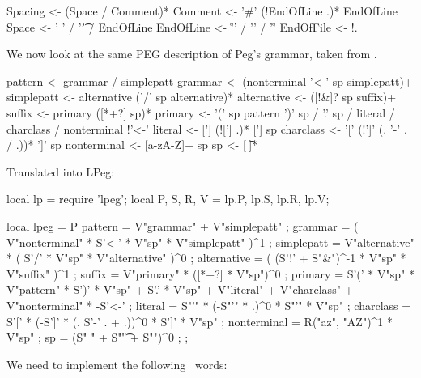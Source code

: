 Spacing    <- (Space / Comment)*
Comment    <- ’#’ (!EndOfLine .)* EndOfLine
Space      <- ’ ’ / ’\t’ / EndOfLine
EndOfLine  <- ’\r\n’ / ’\n’ / ’\r’
EndOfFile  <- !.
\stoptyping

We now look at the same PEG description of Peg's grammar, taken from 
\cite{ierusalimschy2008lpegArticle}. 

\starttyping
pattern     <- grammar / simplepatt
grammar     <- (nonterminal ’<-’ sp simplepatt)+
simplepatt  <- alternative (’/’ sp alternative)*
alternative <- ([!&]? sp suffix)+
suffix      <- primary ([*+?] sp)*
primary     <- 
  ’(’ sp pattern ’)’ sp / ’.’ sp / literal /
  charclass / nonterminal !’<-’
literal     <- [’] (![’] .)* [’] sp
charclass   <- ’[’ (!’]’ (. ’-’ . / .))* ’]’ sp
nonterminal <- [a-zA-Z]+ sp
sp          <- [ \t\n]*
\stoptyping

Translated into LPeg:

\starttyping
local lp = require 'lpeg';
local P, S, R, V = lp.P, lp.S, lp.R, lp.V;

local lpeg = P {
  pattern     = V"grammar" + V"simplepatt" ;
  grammar     = ( V"nonterminal" * S’<-’ * V"sp" * V"simplepatt" )^1 ;
  simplepatt  = V"alternative" * ( S’/’ * V"sp" * V"alternative" )^0 ;
  alternative = ( (S'!' + S"&")^-1 * V"sp" * V"suffix" )^1 ;
  suffix      = V"primary" * ([*+?] * V"sp")^0 ;
  primary     = 
    S’(’ * V"sp" * V"pattern" * S’)’ * V"sp" +
    S’.’ * V"sp" +
    V"literal" +
    V"charclass" +
    V"nonterminal" * -S’<-’ ;
  literal     = S"’" * (-S"’" * .)^0 * S"’" * V"sp" ;
  charclass   = S’[’ * (-S']' * (. S’-’ . + .))^0 * S’]’ * V"sp" ;
  nonterminal = R("az", "AZ")^1 * V"sp" ;
  sp          = (S" " + S"\t" + S"\n")^0 ;
};
\stoptyping

We need to implement the following \joylol\ words:

\startitemize[1]

\item {}

\item {}

\item {}

\item {}

\item {}

\item {}

\item {}

